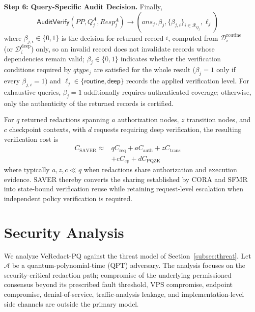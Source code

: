 \documentclass[lettersize,journal]{IEEEtran}
\begin{document}
\medskip
\noindent\textbf{Step 6: Query-Specific Audit Decision.}
Finally,
\begin{equation}
\mathsf{AuditVerify}
(PP,Q_j^A,Resp_j^A)
\rightarrow
(ans_j,\beta_j,\{\beta_{j,i}\}_{i\in\mathcal{R}_{Q_j}},\ell_j)
\end{equation}
where $\beta_{j,i}\in\{0,1\}$ is the decision for returned
record $i$, computed from $\mathcal{D}_i^{\mathrm{routine}}$ (or
$\mathcal{D}_i^{\mathrm{deep}}$) only, so an invalid record does not
invalidate records whose dependencies remain valid;
$\beta_j\in\{0,1\}$ indicates whether the verification conditions
required by $qtype_j$ are satisfied for the whole result
($\beta_j=1$ only if every $\beta_{j,i}=1$) and
$\ell_j\in\{\mathsf{routine},\mathsf{deep}\}$ records the applied
verification level. For exhaustive queries, $\beta_j=1$ additionally
requires authenticated coverage; otherwise, only the authenticity of
the returned records is certified.

For $q$ returned redactions spanning $a$ authorization nodes, $z$
transition nodes, and $c$ checkpoint contexts, with $d$ requests
requiring deep verification, the resulting verification cost is
\begin{equation}
\begin{aligned}
C_{\mathrm{SAVER}}
\approx{}&
qC_{\mathrm{req}}
+aC_{\mathrm{auth}}
+zC_{\mathrm{trans}}\\
&+cC_{\mathrm{cp}}
+dC_{\mathrm{PQZK}}
\end{aligned}
\end{equation}
where typically $a,z,c\ll q$ when redactions share authorization and
execution evidence. SAVER thereby converts the sharing established by
CORA and SFMR into state-bound verification reuse while retaining
request-level escalation when independent policy verification is
required.

    
    
    

\section{Security Analysis}
\label{sec:security}

We analyze VeRedact-PQ against the threat model of Section~\ref{subsec:threat}.
Let $\mathcal{A}$ be a quantum-polynomial-time (QPT) adversary.
The analysis focuses on the security-critical redaction path; compromise
of the underlying permissioned consensus beyond its prescribed fault
threshold, VPS compromise, endpoint compromise, denial-of-service,
traffic-analysis leakage, and implementation-level side channels are
outside the primary model.
\end{document}
